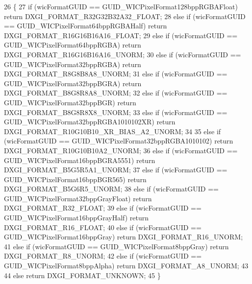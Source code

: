 \begin{DoxyCode}
26 \{
27     \textcolor{keywordflow}{if} (wicFormatGUID == GUID\_WICPixelFormat128bppRGBAFloat) \textcolor{keywordflow}{return} DXGI\_FORMAT\_R32G32B32A32\_FLOAT;
28     \textcolor{keywordflow}{else} \textcolor{keywordflow}{if} (wicFormatGUID == GUID\_WICPixelFormat64bppRGBAHalf) \textcolor{keywordflow}{return} DXGI\_FORMAT\_R16G16B16A16\_FLOAT;
29     \textcolor{keywordflow}{else} \textcolor{keywordflow}{if} (wicFormatGUID == GUID\_WICPixelFormat64bppRGBA) \textcolor{keywordflow}{return} DXGI\_FORMAT\_R16G16B16A16\_UNORM;
30     \textcolor{keywordflow}{else} \textcolor{keywordflow}{if} (wicFormatGUID == GUID\_WICPixelFormat32bppRGBA) \textcolor{keywordflow}{return} DXGI\_FORMAT\_R8G8B8A8\_UNORM;
31     \textcolor{keywordflow}{else} \textcolor{keywordflow}{if} (wicFormatGUID == GUID\_WICPixelFormat32bppBGRA) \textcolor{keywordflow}{return} DXGI\_FORMAT\_B8G8R8A8\_UNORM;
32     \textcolor{keywordflow}{else} \textcolor{keywordflow}{if} (wicFormatGUID == GUID\_WICPixelFormat32bppBGR) \textcolor{keywordflow}{return} DXGI\_FORMAT\_B8G8R8X8\_UNORM;
33     \textcolor{keywordflow}{else} \textcolor{keywordflow}{if} (wicFormatGUID == GUID\_WICPixelFormat32bppRGBA1010102XR) \textcolor{keywordflow}{return} 
      DXGI\_FORMAT\_R10G10B10\_XR\_BIAS\_A2\_UNORM;
34 
35     \textcolor{keywordflow}{else} \textcolor{keywordflow}{if} (wicFormatGUID == GUID\_WICPixelFormat32bppRGBA1010102) \textcolor{keywordflow}{return} DXGI\_FORMAT\_R10G10B10A2\_UNORM;
36     \textcolor{keywordflow}{else} \textcolor{keywordflow}{if} (wicFormatGUID == GUID\_WICPixelFormat16bppBGRA5551) \textcolor{keywordflow}{return} DXGI\_FORMAT\_B5G5R5A1\_UNORM;
37     \textcolor{keywordflow}{else} \textcolor{keywordflow}{if} (wicFormatGUID == GUID\_WICPixelFormat16bppBGR565) \textcolor{keywordflow}{return} DXGI\_FORMAT\_B5G6R5\_UNORM;
38     \textcolor{keywordflow}{else} \textcolor{keywordflow}{if} (wicFormatGUID == GUID\_WICPixelFormat32bppGrayFloat) \textcolor{keywordflow}{return} DXGI\_FORMAT\_R32\_FLOAT;
39     \textcolor{keywordflow}{else} \textcolor{keywordflow}{if} (wicFormatGUID == GUID\_WICPixelFormat16bppGrayHalf) \textcolor{keywordflow}{return} DXGI\_FORMAT\_R16\_FLOAT;
40     \textcolor{keywordflow}{else} \textcolor{keywordflow}{if} (wicFormatGUID == GUID\_WICPixelFormat16bppGray) \textcolor{keywordflow}{return} DXGI\_FORMAT\_R16\_UNORM;
41     \textcolor{keywordflow}{else} \textcolor{keywordflow}{if} (wicFormatGUID == GUID\_WICPixelFormat8bppGray) \textcolor{keywordflow}{return} DXGI\_FORMAT\_R8\_UNORM;
42     \textcolor{keywordflow}{else} \textcolor{keywordflow}{if} (wicFormatGUID == GUID\_WICPixelFormat8bppAlpha) \textcolor{keywordflow}{return} DXGI\_FORMAT\_A8\_UNORM;
43 
44     \textcolor{keywordflow}{else} \textcolor{keywordflow}{return} DXGI\_FORMAT\_UNKNOWN;
45 \}
\end{DoxyCode}
\mbox{\label{class_texture_loader_a089f3c76583c3401fcadd85d26d65b31}} 
